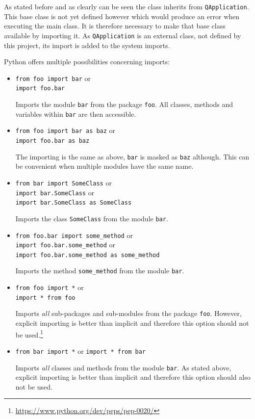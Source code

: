 \documentclass[10pt, openright, notitlepage]{scrreprt}
\begin{document}
As stated before and as clearly can be seen the class inherits from
\texttt{QApplication}. This base class is not yet defined however which would produce
an error when executing the main class. It is therefore necessary to make that
base class available by importing it. As \texttt{QApplication} is an external class,
not defined by this project, its import is added to the system imports.

Python offers multiple possibilities concerning imports:

\begin{itemize}
\item \texttt{from foo import bar} or\\
\texttt{import foo.bar}

Imports the module \texttt{bar} from the package \texttt{foo}. All classes, methods and
variables within \texttt{bar} are then accessible.

\item \texttt{from foo import bar as baz} or\\
\texttt{import foo.bar as baz}

The importing is the same as above, \texttt{bar} is masked as \texttt{baz} although. This
can be convenient when multiple modules have the same name.

\item \texttt{from bar import SomeClass} or\\
\texttt{import bar.SomeClass} or\\
\texttt{import bar.SomeClass as SomeClass}

Imports the class \texttt{SomeClass} from the module \texttt{bar}.

\item \texttt{from foo.bar import some\_method} or\\
\texttt{import foo.bar.some\_method} or\\
\texttt{import foo.bar.some\_method as some\_method}

Imports the method \texttt{some\_method} from the module \texttt{bar}.

\item \texttt{from foo import *} or\\
\texttt{import * from foo}

Imports \emph{all} sub-packages and sub-modules from the package \texttt{foo}. However,
explicit importing is better than implicit and therefore this option should
not be used.\footnote{\url{https://www.python.org/dev/peps/pep-0020/}}

\item \texttt{from bar import *} or
\texttt{import * from bar}

Imports \emph{all} classes and methods from the module \texttt{bar}. As stated above,
explicit importing is better than implicit and therefore this option should
also not be used.
\end{itemize}
\end{document}
